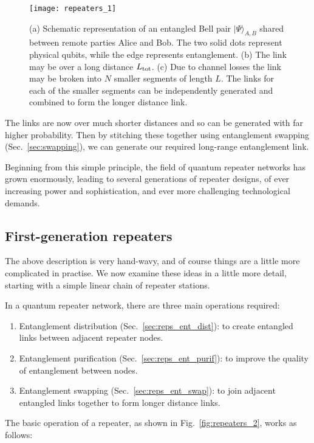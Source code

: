 \begin{figure}[!htbp]
\texttt{[image: repeaters\_1]}
\captionspacefig \caption{(a) Schematic representation of an entangled Bell pair $| \Psi\rangle_{A,B}$ shared between remote parties Alice and Bob. The two solid dots represent physical qubits, while the edge represents entanglement. (b) The link may be over a long distance $L_{\rm tot}$. (c) Due to channel losses the link may be broken into $N$ smaller segments of length $L$. The links for each of the smaller segments can be independently generated and combined to form the longer distance link.} 
\label{fig:repeaters_1}
\end{figure} 

The links are now over much shorter distances and so can be generated with far higher probability. Then by stitching these together using entanglement swapping (Sec.~\ref{sec:swapping}), we can generate our required long-range entanglement link.

Beginning from this simple principle, the field of quantum repeater networks has grown enormously, leading to several generations of repeater designs, of ever increasing power and sophistication, and ever more challenging technological demands.

\subsection{First-generation repeaters}

The above description is very hand-wavy, and of course things are a little more complicated in practise. We now examine these ideas in a little more detail, starting with a simple linear chain of repeater stations. 

In a quantum repeater network, there are three main operations required:
\begin{enumerate}
\item Entanglement distribution (Sec.~\ref{sec:reps_ent_dist}): to create entangled links between adjacent repeater nodes.
\item Entanglement purification (Sec.~\ref{sec:reps_ent_purif}): to improve the quality of entanglement between nodes.
\item Entanglement swapping (Sec.~\ref{sec:reps_ent_swap}): to join adjacent entangled links together to form longer distance links.
\end{enumerate}
The basic operation of a repeater, as shown in Fig.~\ref{fig:repeaters_2}, works as follows:

